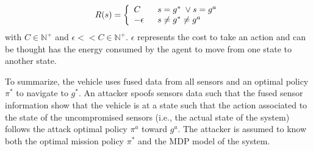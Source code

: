 \documentclass[letterpaper, 10 pt, conference]{ieeeconf}  %
\newcommand{\Ne}{\mathbb {N}}
\newcommand\NB[1]{$\spadesuit$\footnote{NB: #1}}
\begin{document}
%
  \begin{equation}
    R(s)=\left\{
                \begin{array}{ll}
                  C\hspace{2em} s = g^* \; \vee s = g^a \\
                  -\epsilon\hspace{1.6em} s \ne g^* \ne g^a
                \end{array}
              \right.
  \end{equation}
with $C \in \Ne^+$  and $\epsilon << C \in \Ne^+ $. $\epsilon$ represents the cost to take an action and can be thought has the energy consumed by the agent to move from one state to another state.

To summarize, the vehicle uses fused data from all sensors and an optimal policy $\pi^*$ to navigate to $g^*$. An attacker spoofs sensors data such that the fused sensor information show that the vehicle is at a state such that the  action associated to the state of the uncompromised sensors (i.e., the actual state of the system) follows the attack optimal policy $\pi^a$ toward $g^a$. The attacker is assumed to know both the optimal mission policy $\pi^*$ and the MDP model of the system.   
\end{document}
